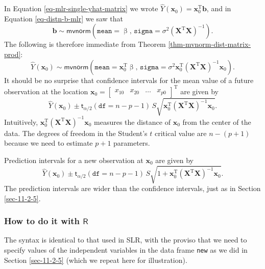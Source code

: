 In Equation \eqref{eq-mlr-single-yhat-matrix} we wrote \(
\hat{Y}(\mathbf{x}_{0})=\mathbf{x}_{0}^{\mathrm{T}}\mathbf{b} \), and
in Equation \eqref{eq-distn-b-mlr} we saw that
\begin{equation}
\mathbf{b}\sim\mathsf{mvnorm}\left(\mathtt{mean} = \upbeta,\,\mathtt{sigma}=\sigma^{2}\left(\mathbf{X}^{\mathrm{T}}\mathbf{X}\right)^{-1}\right).
\end{equation}
The following is therefore immediate from Theorem
\ref{thm-mvnorm-dist-matrix-prod}:
\begin{equation}
\hat{Y}(\mathbf{x}_{0})\sim\mathsf{mvnorm}\left(\mathtt{mean}=\mathbf{x}_{0}^{\mathrm{T}}\upbeta,\,\mathtt{sigma}=\sigma^{2}\mathbf{x}_{0}^{\mathrm{T}}\left(\mathbf{X}^{\mathrm{T}}\mathbf{X}\right)^{-1}\mathbf{x}_{0}\right).
\end{equation}
It should be no surprise that confidence intervals for the mean value
of a future observation at the location
\(\mathbf{x}_{0}=\begin{bmatrix}x_{10} & x_{20} & \ldots &
x_{p0}\end{bmatrix}^{\mathrm{T}}\) are given by
\begin{equation}
\hat{Y}(\mathbf{x}_{0})\pm\mathsf{t}_{\alpha/2}(\mathtt{df}=n-p-1)\, S\sqrt{\mathbf{x}_{0}^{\mathrm{T}}\left(\mathbf{X}^{\mathrm{T}}\mathbf{X}\right)^{-1}\mathbf{x}_{0}}.
\end{equation}
Intuitively,
\(\mathbf{x}_{0}^{\mathrm{T}}\left(\mathbf{X}^{\mathrm{T}}\mathbf{X}\right)^{-1}\mathbf{x}_{0}\)
measures the distance of \(\mathbf{x}_{0}\) from the center of the
data. The degrees of freedom in the Student's \(t\) critical value are
\(n-(p+1)\) because we need to estimate \(p+1\) parameters.

Prediction intervals for a new observation at \(\mathbf{x}_{0}\) are
given by
\begin{equation}
\hat{Y}(\mathbf{x}_{0})\pm\mathsf{t}_{\alpha/2}(\mathtt{df}=n-p-1)\, S\sqrt{1+\mathbf{x}_{0}^{\mathrm{T}}\left(\mathbf{X}^{\mathrm{T}}\mathbf{X}\right)^{-1}\mathbf{x}_{0}}.
\end{equation}
The prediction intervals are wider than the confidence intervals, just as in Section \ref{sec-11-2-5}.

\subsubsection{How to do it with \(\mathsf{R}\)}
\label{sec-12-2-5-1}

The syntax is identical to that used in SLR, with the proviso that we
need to specify values of the independent variables in the data frame
\texttt{new} as we did in Section \ref{sec-11-2-5} (which we
repeat here for illustration).

